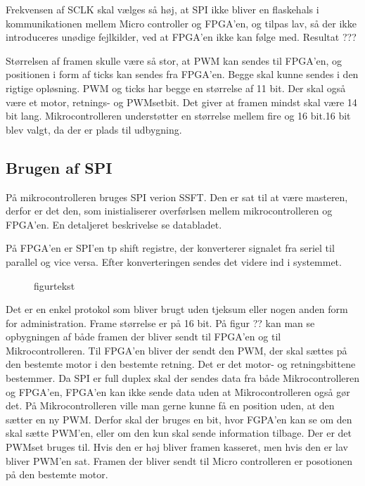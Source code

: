 Frekvensen af SCLK skal vælges så høj, at SPI ikke bliver en flaskehals i kommunikationen mellem Micro controller og FPGA’en, og tilpas lav, så der ikke introduceres unødige fejlkilder, ved at FPGA’en ikke kan følge med. Resultat ???


Størrelsen af framen skulle være så stor, at PWM kan sendes til FPGA’en, og positionen i form af ticks kan sendes fra FPGA’en. Begge skal kunne sendes i den rigtige opløsning. PWM og ticks har begge en størrelse af 11 bit. Der skal også være et motor, retnings- og PWMsetbit. Det giver at framen mindst skal være 14 bit lang. Mikrocontrolleren understøtter en størrelse mellem fire og 16 bit.16 bit blev valgt, da der er plads til udbygning.


\subsection{Brugen af SPI}


På mikrocontrolleren bruges SPI verion SSFT. Den er sat til at være masteren, derfor er det den, som  inistialiserer overførlsen mellem mikrocontrolleren og FPGA'en. En detaljeret beskrivelse se databladet.

På FPGA'en er SPI'en tp shift registre, der konverterer signalet fra seriel til parallel og vice versa. Efter konverteringen sendes det videre ind i systemmet. 

\begin{figure}[!th]
\centering
\begin{tikzpicture}[scale=1]

\end{tikzpicture}
\caption[tekst i indholdsfortegnelsen]{figurtekst}
\label{fig:}
\end{figure}



Det er en enkel protokol som bliver brugt uden tjeksum eller nogen anden form for administration. Frame størrelse er på 16 bit. På figur ?? kan man se opbygningen af både framen der bliver sendt til FPGA’en og til Mikrocontrolleren. Til FPGA’en bliver der sendt den PWM, der skal sættes på den bestemte motor i den bestemte retning. Det er det motor- og retningsbittene bestemmer. Da SPI er full duplex skal der sendes data fra både Mikrocontrolleren og FPGA’en, FPGA’en kan ikke sende data uden at Mikrocontrolleren også gør det. På Mikrocontrolleren ville man gerne kunne få en position uden, at den sætter en ny PWM. Derfor skal der bruges en bit, hvor FGPA’en kan se om den skal sætte PWM’en, eller om den kun skal sende information tilbage. Der er det PWMset bruges til. Hvis den er høj bliver framen kasseret, men hvis den er lav bliver PWM’en sat. Framen der bliver sendt til Micro controlleren er posotionen på den bestemte motor.  


